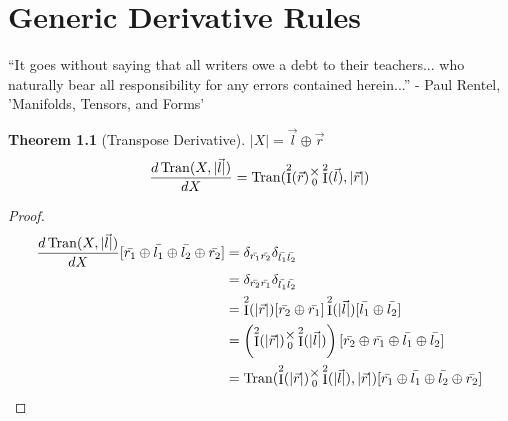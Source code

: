 \documentclass[12pt]{book}
\theoremstyle{definition}
\theoremstyle{plain}
\newtheorem{theorem}{Theorem}[chapter]
\theoremstyle{ppart}
\theoremstyle{case}
\theoremstyle{solution}
\DeclareMathOperator{\Ident}{I}
\DeclareMathOperator{\Tran}{Tran}
\newcommand{\mmult}[1]{\text{\raisebox{1ex}{$\underset{#1}{\times}$}}}
\begin{document}
\chapter{Generic Derivative Rules}

\begin{displayquote}
``It goes without saying that all writers owe a debt to their teachers... who
naturally bear all responsibility for any errors contained herein...''
- Paul Rentel, 'Manifolds, Tensors, and Forms'
\end{displayquote}

\begin{theorem}[Transpose Derivative]
\label{tran_derivative}
$|X| = \vec{l} \oplus \vec{r}$
\[
 \frac{d\Tran(X, |\vec{l}|)}{dX} =
 \Tran(\Ident^2(\vec{r}) \mmult{0} \Ident^2(\vec{l}), |\vec{r}|)
\]
\end{theorem}
\begin{proof}
\begin{align*}
 \frac{d\Tran(X, |\vec{l}|)}{dX}
 [\bar{r_1} \oplus \bar{l_1} \oplus \bar{l_2} \oplus \bar{r_2}]
 &= \delta_{\bar{r_1}\bar{r_2}} \delta_{\bar{l_1}\bar{l_2}} \\
 &= \delta_{\bar{r_2}\bar{r_1}} \delta_{\bar{l_1}\bar{l_2}} \\
 &=
  \Ident^2(|\vec{r}|)[\bar{r_2}\oplus\bar{r_1}]
  \Ident^2(|\vec{l}|)[\bar{l_1}\oplus\bar{l_2}] \\
 &=
   \left(
    \Ident^2(|\vec{r}|)
    \mmult{0}
    \Ident^2(|\vec{l}|)
  \right)
  [\bar{r_2}\oplus\bar{r_1}\oplus\bar{l_1}\oplus\bar{l_2}] \\
 &=
  \Tran(
    \Ident^2(|\vec{r}|)
    \mmult{0}
    \Ident^2(|\vec{l}|)
  , |\vec{r}|) 
 [\bar{r_1} \oplus \bar{l_1} \oplus \bar{l_2} \oplus \bar{r_2}]
\end{align*}
\end{proof}
\end{document}
